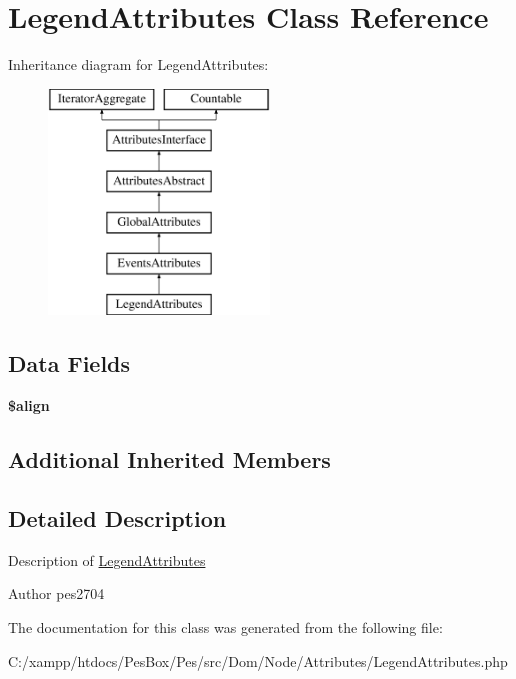 \hypertarget{class_pes_1_1_dom_1_1_node_1_1_attributes_1_1_legend_attributes}{}\section{Legend\+Attributes Class Reference}
\label{class_pes_1_1_dom_1_1_node_1_1_attributes_1_1_legend_attributes}
Inheritance diagram for Legend\+Attributes\+:\begin{figure}[H]
\begin{center}
\leavevmode
\includegraphics[height=6.000000cm]{class_pes_1_1_dom_1_1_node_1_1_attributes_1_1_legend_attributes}
\end{center}
\end{figure}
\subsection*{Data Fields}
\begin{DoxyCompactItemize}
\item 
\mbox{\label{class_pes_1_1_dom_1_1_node_1_1_attributes_1_1_legend_attributes_a13b48c7a9f88541928ec84660fab1f36}} 
{\bfseries \$align}
\end{DoxyCompactItemize}
\subsection*{Additional Inherited Members}


\subsection{Detailed Description}
Description of \mbox{\hyperlink{class_pes_1_1_dom_1_1_node_1_1_attributes_1_1_legend_attributes}{Legend\+Attributes}}

\begin{DoxyAuthor}{Author}
pes2704 
\end{DoxyAuthor}


The documentation for this class was generated from the following file\+:\begin{DoxyCompactItemize}
\item 
C\+:/xampp/htdocs/\+Pes\+Box/\+Pes/src/\+Dom/\+Node/\+Attributes/Legend\+Attributes.\+php\end{DoxyCompactItemize}
